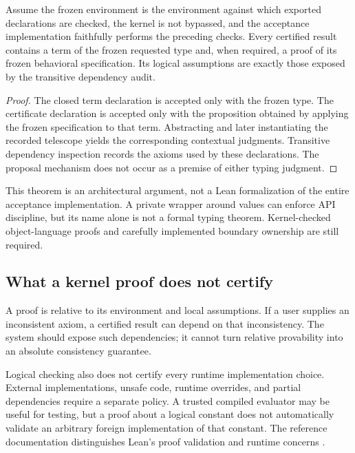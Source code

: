 \begin{theorem}
Assume the frozen environment is the environment against which exported declarations are checked, the kernel is not bypassed, and the acceptance implementation faithfully performs the preceding checks. Every certified result contains a term of the frozen requested type and, when required, a proof of its frozen behavioral specification. Its logical assumptions are exactly those exposed by the transitive dependency audit.
\end{theorem}
\begin{proof}
The closed term declaration is accepted only with the frozen type. The certificate declaration is accepted only with the proposition obtained by applying the frozen specification to that term. Abstracting and later instantiating the recorded telescope yields the corresponding contextual judgments. Transitive dependency inspection records the axioms used by these declarations. The proposal mechanism does not occur as a premise of either typing judgment.
\end{proof}

This theorem is an architectural argument, not a Lean formalization of the entire acceptance implementation. A private  wrapper around  values can enforce API discipline, but its name alone is not a formal typing theorem. Kernel-checked object-language proofs and carefully implemented boundary ownership are still required.

\subsection{What a kernel proof does not certify}

A proof is relative to its environment and local assumptions. If a user supplies an inconsistent axiom, a certified result can depend on that inconsistency. The system should expose such dependencies; it cannot turn relative provability into an absolute consistency guarantee.

Logical checking also does not certify every runtime implementation choice. External implementations, unsafe code, runtime overrides, and partial dependencies require a separate policy. A trusted compiled evaluator may be useful for testing, but a proof about a logical constant does not automatically validate an arbitrary foreign implementation of that constant. The reference documentation distinguishes Lean's proof validation and runtime concerns \cite{lean-validation,lean-runtime}.

